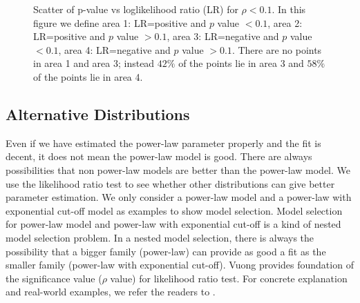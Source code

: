 \documentclass[10pt,conference,letterpaper]{IEEEtran}
\begin{document}
\begin{figure}
\centering
{}
\caption{Scatter of p-value vs loglikelihood ratio (LR) for $\rho < 0.1$. In this figure we define area 1: LR=positive and $p$ value $<0.1$, area 2: LR=positive and $p$ value $>0.1$, area 3: LR=negative and $p$ value $<0.1$, area 4: LR=negative and $p$ value $>0.1$. There are no points in area 1 and area 3; instead $42\%$ of the points lie in area 3 and $58\%$ of the points lie in area 4.} 
\label{fig:scatter-pvalue-vs-lr-for-rho-le-01}
\vspace{-2mm}
\end{figure}


\subsection{Alternative Distributions}
Even if we have estimated the power-law parameter properly and the fit is decent, it does not mean the power-law model is good.
There are always possibilities that non power-law models are better than the power-law model.
We use the likelihood ratio test \cite{vuong1989likelihood} to see whether other distributions can give better parameter estimation.
We only consider a power-law model and a power-law with exponential cut-off model as examples to show model selection.
Model selection for power-law model and power-law with exponential cut-off is a kind of nested model selection problem. 
In a nested model selection,  there is always the possibility that a bigger family (power-law) can provide as good a fit as the smaller family (power-law with exponential cut-off). 
Vuong \cite{vuong1989likelihood} provides foundation of the significance value ($\rho$ value) for likelihood ratio test. 
For concrete explanation and real-world examples, we refer the readers to \cite{clauset2009power}.
\end{document}
